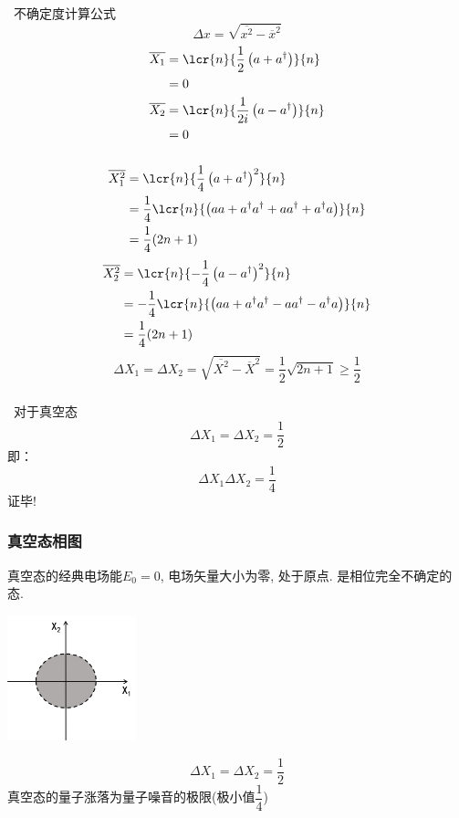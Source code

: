 \begin{frame}
  \frametitle{}
  \例[5.试证明真空态是最小不确定度乘积态]{
   \[ \Delta X_1 \Delta X_2 =\dfrac{1}{4} \] 
  }
  \解~不确定度计算公式\[ \Delta x  = \sqrt{ \overline{x^2}- \overline{x}^2}\] 
\[ 
\begin{aligned}
  \overline{ X_1}  &= \lcr{n}{\frac{1}{2}\left(a+a^{\dagger}\right)}{n} \\ 
        &= 0 \\
  \overline{ X_2 } &= \lcr{n}{\frac{1}{2i}\left(a-a^{\dagger}\right)}{n} \\ 
        &= 0 
\end{aligned}\]
\end{frame}

\begin{frame}
  \frametitle{}
\[ 
\begin{aligned}
  \overline{X_1 ^2} &= \lcr{n}{\frac{1}{4}\left(a+a^{\dagger}\right)^2}{n} \\
        &= \frac{1}{4} \lcr{n}{\left(aa+a^{\dagger}a^{\dagger}+aa^{\dagger}+ a^{\dagger}a\right)}{n} \\
        &= \frac{1}{4} (2n+1)
\end{aligned}\]
\[
\begin{aligned}
  \overline{X_2 ^2} &= \lcr{n}{-\frac{1}{4}\left(a-a^{\dagger}\right)^2}{n} \\
  &= -\frac{1}{4} \lcr{n}{\left(aa+a^{\dagger}a^{\dagger}-aa^{\dagger}- a^{\dagger}a\right)}{n} \\
  &= \frac{1}{4} (2n+1)
\end{aligned}\]
\[ \Delta X_1 = \Delta X_2  =  \sqrt{ \overline{X^2}- \overline{X}^2} =\frac{1}{2}\sqrt{2n+1}\geq \frac{1}{2}\] 
\end{frame}

\begin{frame}
 \frametitle{}
  对于真空态
 \[ \Delta X_1 = \Delta X_2  = \frac{1}{2}\]
 即：
 \[ \Delta X_1 \Delta X_2  = \frac{1}{4}\]    
 证毕!\\ 
\end{frame}

\begin{frame}
 \frametitle{真空态相图}
真空态的经典电场能$E_0=0$, 电场矢量大小为零, 处于原点. 是相位完全不确定的态. 
      \begin{center}
         \includegraphics[width=0.28\textwidth]{figs/4.png}
      \end{center}
      \[ \Delta X_1 = \Delta X_2  = \frac{1}{2}\]
真空态的量子涨落为量子噪音的极限(极小值$\dfrac{1}{4}$) 
\end{frame}

